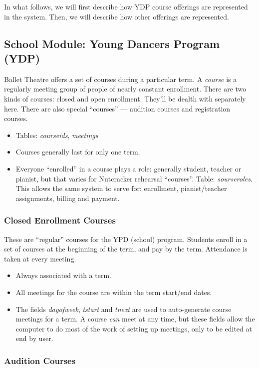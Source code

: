 \documentclass[11pt]{article}
\begin{document}
In what follows, we will first describe how YDP course offerings are
represented in the system.  Then, we will describe how other offerings
are represented.

\subsection{School Module: Young Dancers Program (YDP)}

Ballet Theatre offers a set of courses during a particular term.  A \emph{course} is a regularly meeting group of people of nearly constant enrollment.  There are two kinds of courses: closed and open enrollment.  They'll be dealth with separately here.  There are also special ``courses'' --- audition courses and registration courses.

\begin{itemize}
 \item Tables: \emph{courseids}, \emph{meetings}
 \item Courses generally last for only one term.
 \item Everyone ``enrolled'' in a course plays a role: generally student, teacher or pianist, but that varies for Nutcracker rehearsal ``courses''.  Table: \emph{sourseroles}.  This allows the same system to serve for: enrollment, pianist/teacher assignments, billing and payment.
 \end{itemize}

 \subsubsection{Closed Enrollment Courses}

These are ``regular'' courses for the YPD (school) program.  Students enroll in a set of courses at the beginning of the term, and pay by the term.  Attendance is taken at every meeting.
 \begin{itemize}
 \item Always associated with a term.
 \item All meetings for the course are within the term start/end dates.
 \item The fields \emph{dayofweek}, \emph{tstart} and \emph{tnext} are used to auto-generate course meetings for a term.  A course \emph{can} meet at any time, but these fields allow the computer to do most of the work of setting up meetings, only to be edited at end by user.
 \end{itemize}

 \subsubsection{Audition Courses}
\end{document}
